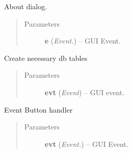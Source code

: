 \documentclass[letterpaper,10pt,english]{sphinxmanual}
\begin{document}
\begin{fulllineitems}
\begin{fulllineitems}
\begin{quote}
\begin{description}
\end{description}\end{quote}

\end{fulllineitems}


\begin{fulllineitems}
\label{api:wos.GUI.OnAboutBox}
About dialog.
\begin{quote}\begin{description}
\item[{Parameters}] \leavevmode
\textbf{e} (\emph{Event.}) -- GUI Event.

\end{description}\end{quote}

\end{fulllineitems}


\begin{fulllineitems}
\label{api:wos.GUI.OnCreateTables}
Create necessary db tables
\begin{quote}\begin{description}
\item[{Parameters}] \leavevmode
\textbf{evt} (\emph{Event}) -- GUI event.

\end{description}\end{quote}

\end{fulllineitems}


\begin{fulllineitems}
\label{api:wos.GUI.OnEvtBtn}
Event Button handler
\begin{quote}\begin{description}
\item[{Parameters}] \leavevmode
\textbf{evt} (\emph{Event.}) -- GUI Event.

\end{description}\end{quote}

\end{fulllineitems}


\end{fulllineitems}
\end{document}
